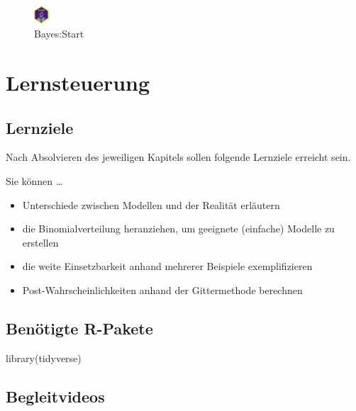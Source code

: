 \documentclass[
  a4paper,
  DIV=11]{scrreprt}
\newenvironment{Shaded}{\begin{snugshade}}{\end{snugshade}}
\newcommand{\FunctionTok}[1]{\textcolor[rgb]{0.28,0.35,0.67}{#1}}
\newcommand{\NormalTok}[1]{\textcolor[rgb]{0.00,0.23,0.31}{#1}}
\providecommand{\tightlist}{%
  \setlength{\itemsep}{0pt}\setlength{\parskip}{0pt}}\usepackage{longtable,booktabs,array}
\theoremstyle{definition}
\theoremstyle{remark}
\begin{document}
\begin{figure}

{\centering \includegraphics[width=0.05\textwidth,height=\textheight]{./img/Golem_hex.png}

}

\caption{Bayes:Start}

\end{figure}

\hypertarget{lernsteuerung-3}{%
\section{Lernsteuerung}\label{lernsteuerung-3}}

\hypertarget{lernziele-4}{%
\subsection{Lernziele}\label{lernziele-4}}

Nach Absolvieren des jeweiligen Kapitels sollen folgende Lernziele
erreicht sein.

Sie können \ldots{}

\begin{itemize}
\tightlist
\item
  Unterschiede zwischen Modellen und der Realität erläutern
\item
  die Binomialverteilung heranziehen, um geeignete (einfache) Modelle zu
  erstellen
\item
  die weite Einsetzbarkeit anhand mehrerer Beispiele exemplifizieren
\item
  Post-Wahrscheinlichkeiten anhand der Gittermethode berechnen
\end{itemize}

\hypertarget{benuxf6tigte-r-pakete-1}{%
\subsection{Benötigte R-Pakete}\label{benuxf6tigte-r-pakete-1}}

\begin{Shaded}
\begin{Highlighting}[]
\FunctionTok{library}\NormalTok{(tidyverse)}
\end{Highlighting}
\end{Shaded}

\hypertarget{begleitvideos-3}{%
\subsection{Begleitvideos}\label{begleitvideos-3}}
\end{document}
